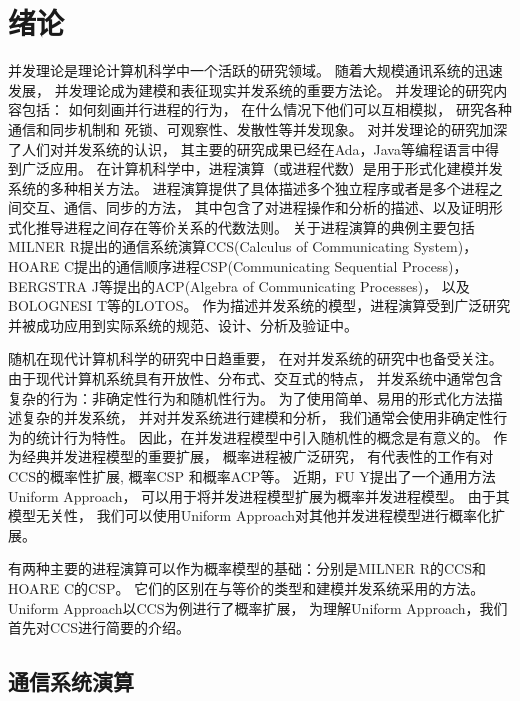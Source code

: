 
\chapter{绪论}\label{ch:intro}

并发理论是理论计算机科学中一个活跃的研究领域。
  随着大规模通讯系统的迅速发展，
  并发理论成为建模和表征现实并发系统的重要方法论。
  并发理论的研究内容包括：
  如何刻画并行进程的行为，
  在什么情况下他们可以互相模拟，
  研究各种通信和同步机制和
  死锁、可观察性、发散性等并发现象。
  对并发理论的研究加深了人们对并发系统的认识，
  其主要的研究成果已经在Ada，Java等编程语言中得到广泛应用\cite{计算机科学技术百科全书}。
  在计算机科学中，进程演算（或进程代数）是用于形式化建模并发系统的多种相关方法。
  进程演算提供了具体描述多个独立程序或者是多个进程之间交互、通信、同步的方法，
  其中包含了对进程操作和分析的描述、以及证明形式化推导进程之间存在等价关系的代数法则\cite{History}。
  关于进程演算的典例主要包括
  MILNER R提出的通信系统演算CCS(Calculus of Communicating System)\cite{Milner_CCS}，
   HOARE C提出的通信顺序进程CSP(Communicating Sequential Process)\cite{Hoare_CSP}，
   BERGSTRA J等提出的ACP(Algebra of Communicating Processes)\cite{BERGSTRA_ACP}，
   以及BOLOGNESI T等的LOTOS\cite{LOTOS}。%
   作为描述并发系统的模型，进程演算受到广泛研究并被成功应用到实际系统的规范、设计、分析及验证中。

随机在现代计算机科学的研究中日趋重要，
在对并发系统的研究中也备受关注。
由于现代计算机系统具有开放性、分布式、交互式的特点，
并发系统中通常包含复杂的行为：非确定性行为和随机性行为。
为了使用简单、易用的形式化方法描述复杂的并发系统，
并对并发系统进行建模和分析，
我们通常会使用非确定性行为的统计行为特性。
因此，在并发进程模型中引入随机性的概念是有意义的。
作为经典并发进程模型的重要扩展，
概率进程被广泛研究，
有代表性的工作有对CCS的概率性扩展\cite{CCS_Prob_1,CCS_Prob_2},
概率CSP\cite{CSP_Prob} 和概率ACP\cite{ACP_Prob}等。
近期，FU Y提出了一个通用方法Uniform Approach\cite{Fu_UniformApproach}，
可以用于将并发进程模型扩展为概率并发进程模型。
由于其模型无关性，
我们可以使用Uniform Approach对其他并发进程模型进行概率化扩展。

有两种主要的进程演算可以作为概率模型的基础：分别是MILNER R的CCS\cite{Milner_CCS}和HOARE C的CSP\cite{Hoare_CSP}。
它们的区别在与等价的类型和建模并发系统采用的方法\cite{DIFF_CCS_CSP}。
Uniform Approach以CCS为例进行了概率扩展，
为理解Uniform Approach，我们首先对CCS进行简要的介绍。

\section{通信系统演算}

